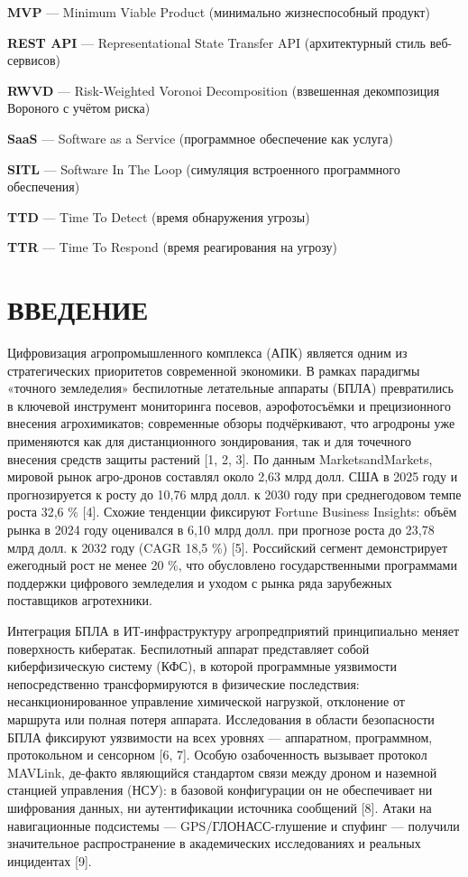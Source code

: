 \documentclass[14pt,a4paper]{extarticle}
\begin{document}
\noindent\textbf{MVP} --- Minimum Viable Product (минимально жизнеспособный продукт)

\noindent\textbf{REST API} --- Representational State Transfer API (архитектурный стиль веб-сервисов)

\noindent\textbf{RWVD} --- Risk-Weighted Voronoi Decomposition (взвешенная декомпозиция Вороного с учётом риска)

\noindent\textbf{SaaS} --- Software as a Service (программное обеспечение как услуга)

\noindent\textbf{SITL} --- Software In The Loop (симуляция встроенного программного обеспечения)

\noindent\textbf{TTD} --- Time To Detect (время обнаружения угрозы)

\noindent\textbf{TTR} --- Time To Respond (время реагирования на угрозу)

\clearpage

\hypertarget{ux432ux432ux435ux434ux435ux43dux438ux435}{%
\section{ВВЕДЕНИЕ}\label{ux432ux432ux435ux434ux435ux43dux438ux435}}

Цифровизация агропромышленного комплекса (АПК) является одним из стратегических приоритетов современной экономики. В рамках парадигмы «точного земледелия» беспилотные летательные аппараты (БПЛА) превратились в ключевой инструмент мониторинга посевов, аэрофотосъёмки и прецизионного внесения агрохимикатов; современные обзоры подчёркивают, что агродроны уже применяются как для дистанционного зондирования, так и для точечного внесения средств защиты растений {[}1, 2, 3{]}. По данным MarketsandMarkets, мировой рынок агро-дронов составлял около 2,63 млрд долл. США в 2025 году и прогнозируется к росту до 10,76 млрд долл. к 2030 году при среднегодовом темпе роста 32,6 \% {[}4{]}. Схожие тенденции фиксируют Fortune Business Insights: объём рынка в 2024 году оценивался в 6,10 млрд долл. при прогнозе роста до 23,78 млрд долл. к 2032 году (CAGR 18,5 \%) {[}5{]}. Российский сегмент демонстрирует ежегодный рост не менее 20 \%, что обусловлено государственными программами поддержки цифрового земледелия и уходом с рынка ряда зарубежных поставщиков агротехники.

Интеграция БПЛА в ИТ-инфраструктуру агропредприятий принципиально меняет поверхность кибератак. Беспилотный аппарат представляет собой киберфизическую систему (КФС), в которой программные уязвимости непосредственно трансформируются в физические последствия: несанкционированное управление химической нагрузкой, отклонение от маршрута или полная потеря аппарата. Исследования в области безопасности БПЛА фиксируют уязвимости на всех уровнях --- аппаратном, программном, протокольном и сенсорном {[}6, 7{]}. Особую озабоченность вызывает протокол MAVLink, де-факто являющийся стандартом связи между дроном и наземной станцией управления (НСУ): в базовой конфигурации он не обеспечивает ни шифрования данных, ни аутентификации источника сообщений {[}8{]}. Атаки на навигационные подсистемы --- GPS/ГЛОНАСС-глушение и спуфинг --- получили значительное распространение в академических исследованиях и реальных инцидентах {[}9{]}.
\end{document}
